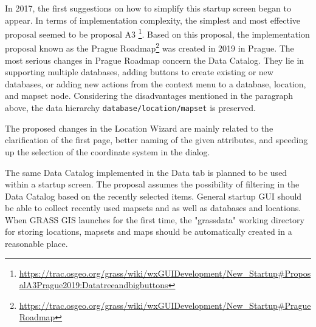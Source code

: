 \documentclass[a4paper,10pt,twoside]{article}
\begin{document}
In 2017, the first suggestions on how to simplify this startup screen
began to appear. In terms of implementation complexity, the simplest
and most effective proposal seemed to be proposal A3
\footnote{\url{https://trac.osgeo.org/grass/wiki/wxGUIDevelopment/New\_Startup\#ProposalA3Prague2019:Datatreeandbigbuttons}}. Based
on this proposal, the implementation proposal known as the Prague
Roadmap\footnote{\url{https://trac.osgeo.org/grass/wiki/wxGUIDevelopment/New\_Startup\#PragueRoadmap}}
was created in 2019 in Prague.  The most serious changes in Prague
Roadmap concern the Data Catalog. They lie in supporting multiple
databases, adding buttons to create existing or new databases, or
adding new actions from the context menu to a database, location, and
mapset node. Considering the disadvantages mentioned in the paragraph
above, the data hierarchy \texttt{database/location/mapset} is
preserved. 


\noindent The proposed changes in the Location Wizard are mainly related to the
clarification of the first page, better naming of the given
attributes, and speeding up the selection of the coordinate system in
the dialog. 

The same Data Catalog implemented in the Data tab is
planned to be used within a startup screen. 
The proposal assumes the possibility of
filtering in the Data Catalog based on the recently selected
items. General startup GUI should be able to collect recently used mapsets and
as well as databases and locations. 
When GRASS GIS  launches for the first time, the "grassdata" working directory for
storing locations, mapsets and maps should be automatically created in
a reasonable place.

\end{document}
